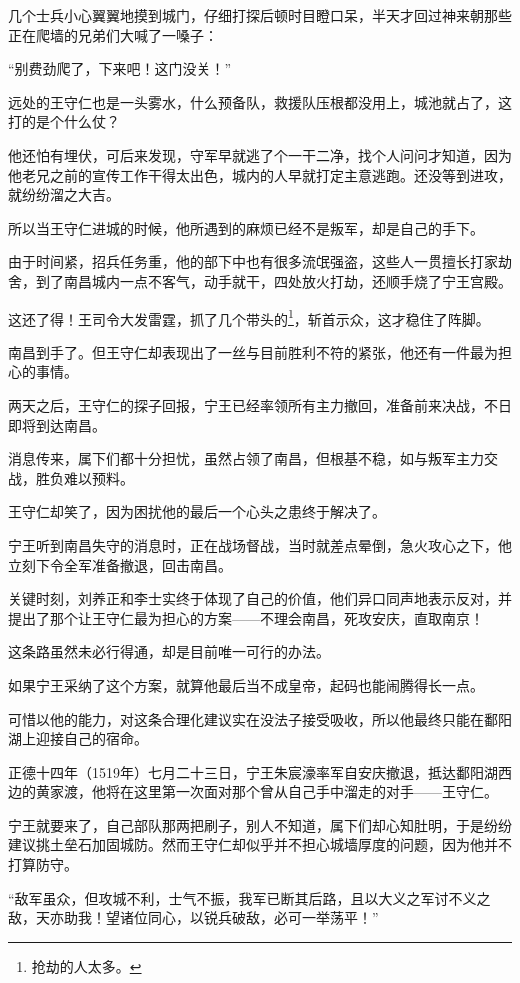 \begin{multicols}{\theparacolNo}
		几个士兵小心翼翼地摸到城门，仔细打探后顿时目瞪口呆，半天才回过神来朝那些正在爬墙的兄弟们大喊了一嗓子：

		“别费劲爬了，下来吧！这门没关！”

		远处的王守仁也是一头雾水，什么预备队，救援队压根都没用上，城池就占了，这打的是个什么仗？

		他还怕有埋伏，可后来发现，守军早就逃了个一干二净，找个人问问才知道，因为他老兄之前的宣传工作干得太出色，城内的人早就打定主意逃跑。还没等到进攻，就纷纷溜之大吉。

		所以当王守仁进城的时候，他所遇到的麻烦已经不是叛军，却是自己的手下。

		由于时间紧，招兵任务重，他的部下中也有很多流氓强盗，这些人一贯擅长打家劫舍，到了南昌城内一点不客气，动手就干，四处放火打劫，还顺手烧了宁王宫殿。

		这还了得！王司令大发雷霆，抓了几个带头的\footnote{抢劫的人太多。}，斩首示众，这才稳住了阵脚。

		南昌到手了。但王守仁却表现出了一丝与目前胜利不符的紧张，他还有一件最为担心的事情。

		两天之后，王守仁的探子回报，宁王已经率领所有主力撤回，准备前来决战，不日即将到达南昌。

		消息传来，属下们都十分担忧，虽然占领了南昌，但根基不稳，如与叛军主力交战，胜负难以预料。

		王守仁却笑了，因为困扰他的最后一个心头之患终于解决了。

		宁王听到南昌失守的消息时，正在战场督战，当时就差点晕倒，急火攻心之下，他立刻下令全军准备撤退，回击南昌。

		关键时刻，刘养正和李士实终于体现了自己的价值，他们异口同声地表示反对，并提出了那个让王守仁最为担心的方案——不理会南昌，死攻安庆，直取南京！

		这条路虽然未必行得通，却是目前唯一可行的办法。

		如果宁王采纳了这个方案，就算他最后当不成皇帝，起码也能闹腾得长一点。

		可惜以他的能力，对这条合理化建议实在没法子接受吸收，所以他最终只能在鄱阳湖上迎接自己的宿命。

		正德十四年（1519年）七月二十三日，宁王朱宸濠率军自安庆撤退，抵达鄱阳湖西边的黄家渡，他将在这里第一次面对那个曾从自己手中溜走的对手——王守仁。

		宁王就要来了，自己部队那两把刷子，别人不知道，属下们却心知肚明，于是纷纷建议挑土垒石加固城防。然而王守仁却似乎并不担心城墙厚度的问题，因为他并不打算防守。

		“敌军虽众，但攻城不利，士气不振，我军已断其后路，且以大义之军讨不义之敌，天亦助我！望诸位同心，以锐兵破敌，必可一举荡平！”


\end{multicols}
